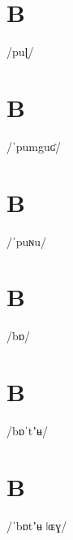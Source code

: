 \documentclass[10pt,a4paper,twoside]{book}
\begin{document}
\section*{B}

\begin{multicols}{3}
 {/puɭ/} {}
\end{multicols}

\section*{B}

\begin{multicols}{3}
 {/ˈpumguʛ/} {}
\end{multicols}

\section*{B}

\begin{multicols}{3}
 {/ˈpuɴu/} {}
\end{multicols}

\section*{B}

\begin{multicols}{3}
 {/bɒ/} {}
\end{multicols}

\section*{B}

\begin{multicols}{3}
 {/bɒˈtʼʉ/} {}
\end{multicols}

\section*{B}

\begin{multicols}{3}
 {/ˈbɒtʼʉ ǀɶɣ/} {}
\end{multicols}
\end{document}
